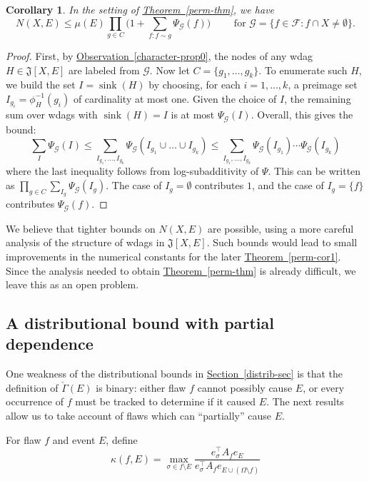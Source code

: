 \documentclass[11pt]{article}
\newcommand{\expref}[2]{\texorpdfstring{\hyperref[#2]{#1~\ref{#2}}}{#1~\ref{#2}}}
\newtheorem{corollary}[theorem]{Corollary}
\DeclareMathOperator{\sink}{sink}
\begin{document}
\begin{corollary}
\label{perm-thmaa}
In the setting of \expref{Theorem}{perm-thm}, we have $$
N(X,E) \leq \mu(E) \prod_{g \in C} \bigl(1 + \sum_{f: f \sim g} \Psi_{\mathcal G}(f) \bigr) \qquad \text{ for $\mathcal G = \{f  \in \mathcal F: f \cap X \neq \emptyset \}$}.
$$ 
\end{corollary}
\begin{proof}
First, by \expref{Observation}{character-prop0},  the nodes of any wdag $H \in \mathfrak J[X,E]$ are labeled from $\mathcal G$.  Now let $C = \{g_1, \dots, g_k \}$. To enumerate such $H$, we build the set $I = \sink(H)$ by choosing, for each $i = 1, \dots, k$, a preimage set $I_{g_i} = \phi^{-1}_H(g_i)$ of cardinality at most one.  Given the choice of $I$, the remaining sum  over wdags with $\sink(H) = I$ is at most $\Psi_{\mathcal G}(I)$. Overall, this gives the bound:
$$
\sum_{I} \Psi_{\mathcal G}(I) \leq \sum_{I_{g_1}, \dots, I_{g_k} } \Psi_{\mathcal G} ( I_{g_1} \cup \dots \cup I_{g_k}) \leq  \sum_{I_{g_1}, \dots, I_{g_k} } \Psi_{\mathcal G}( I_{g_1} ) \cdots \Psi_{\mathcal G}(I_{g_k})
$$ 
where the last inequality follows from log-subadditivity of $\Psi$. This can be written as $\prod_{g \in C} \sum_{I_g} \Psi_{\mathcal G}(I_{g})$. The case of $I_{g} = \emptyset$ contributes $1$, and the case of $I_{g} = \{f \}$ contributes $\Psi_{\mathcal G}(f)$. 
\end{proof}
 
 We believe that tighter bounds on $N(X,E)$ are possible, using a more careful analysis of the structure of wdags in $\mathfrak J[X,E]$. Such bounds would lead to small improvements in the numerical constants for the later \expref{Theorem}{perm-cor1}. Since the analysis needed to obtain \expref{Theorem}{perm-thm} is already difficult, we leave this as an open problem.

\subsection{A distributional bound with partial dependence}
One weakness of the distributional bounds in \expref{Section}{distrib-sec} is that the definition of $\check \Gamma(E)$ is binary: either flaw $f$ cannot possibly cause $E$, or every occurrence of $f$ must be tracked to determine if it caused $E$. The next results allow us to take account of flaws which can ``partially'' cause $E$.

For flaw $f$ and event $E$, define $$
\kappa(f, E) = \max_{\sigma \in f \setminus E} \frac{e_{\sigma}^{\top} A_f e_E}{e_{\sigma}^{\top} A_f e_{E \cup (\Omega \setminus f)}}
$$
\end{document}
